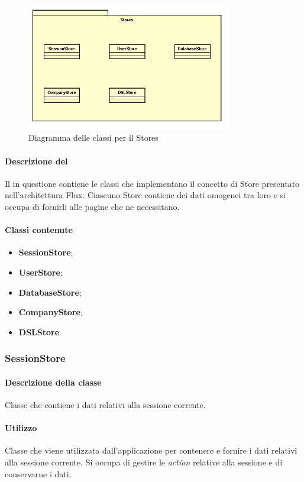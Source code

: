 \begin{figure}[h]
\centering
\includegraphics[width=0.8\textwidth]{res/sections/imgs/stores-diagram.jpg}
\caption{Diagramma delle classi per il  Stores}
\end{figure}

\paragraph*{Descrizione del }
Il  in questione contiene le classi che implementano il concetto di Store presentato nell'architettura Flux. Ciascuno Store contiene dei dati omogenei tra loro e si occupa di fornirli alle pagine che ne necessitano.
\paragraph*{Classi contenute}
\begin{itemize}
\item \textbf{SessionStore};
\item \textbf{UserStore};
\item \textbf{DatabaseStore};
\item \textbf{CompanyStore};
\item \textbf{DSLStore}.
\end{itemize}

\subsubsection{SessionStore}
\paragraph*{Descrizione della classe}
Classe che contiene i dati relativi alla sessione corrente.
\paragraph*{Utilizzo}
Classe che viene utilizzata dall'applicazione per contenere e fornire i dati relativi alla sessione corrente. Si occupa di gestire le \textit{action} relative alla sessione e di conservarne i dati.
